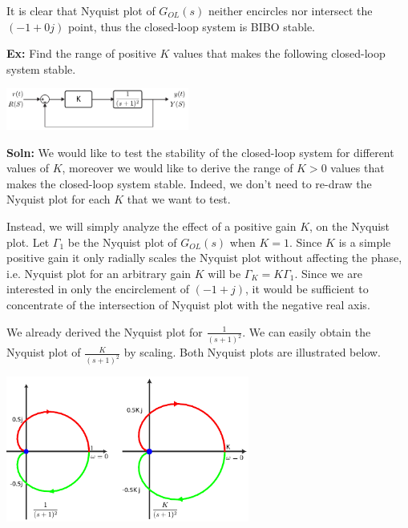 \documentclass{article}
\begin{document}
\vspace{3 pt}

It is clear that Nyquist plot of $G_{OL}(s)$ neither encircles nor
intersect the $(-1 + 0 j)$ point, thus the closed-loop system is 
BIBO stable. 

\vspace{6 pt}

\textbf{Ex:} Find the range of positive $K$ values that makes the following
closed-loop system stable.

\vspace{6 pt}

  \begin{minipage}[h]{1\linewidth}
    \begin{center}
      \includegraphics[width=0.45\textwidth]{figs/ex2block}
    \end{center}
  \end{minipage}

\vspace{6 pt}

\textbf{Soln:} We would like to test the stability of the closed-loop system
for different values of $K$, moreover we would like to derive 
the range of $K > 0$ values that makes the closed-loop system 
stable. Indeed, we don't need to re-draw the Nyquist plot
for each $K$ that we want to test. 

Instead, we will simply analyze the
effect of a positive gain $K$, on the Nyquist plot. Let 
$\Gamma_1$ be the Nyquist plot of $G_{OL}(s)$ when $K = 1$. Since $K$
is a simple positive gain it only radially scales the Nyquist plot
without affecting the phase, i.e. Nyquist plot for an arbitrary gain
$K$ will be $\Gamma_K = K \Gamma_1$. Since we are interested in only
the encirclement  of $(-1 + j)$, it would be sufficient to concentrate of the 
intersection of Nyquist plot with the negative real axis. 

We already derived the Nyquist plot for $\frac{1}{(s+1)^2}$. 
We can easily obtain the Nyquist plot of $\frac{K}{(s+1)^2}$
by scaling. Both Nyquist plots are illustrated below. 

\vspace{6 pt}

  \begin{minipage}[h]{1\linewidth}
    \begin{center}
      \includegraphics[width=0.6\textwidth]{figs/exK}
    \end{center}
  \end{minipage}
\end{document}
